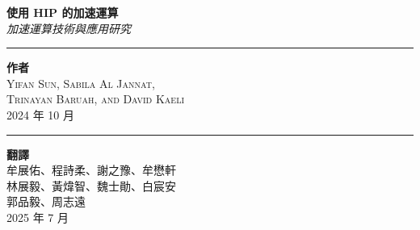 \begin{titlepage}


\vspace{2.5cm}
\parbox[l]{.9\textwidth}{\centering
    {\HUGE \bfseries 使用 HIP 的加速運算}\\[2\baselineskip]
    {\Large \textit{加速運算技術與應用研究}}\\[.5\baselineskip]}

\vspace*{\fill}

\parbox[b]{.5\textwidth}{
    \rule{1pt}{.125\textheight}
    \hspace{0.025\textwidth}
    \parbox[b]{.8\textwidth}{
        {\Large \bfseries 作者}\\[1\baselineskip]
        {\Large \textsc{Yifan Sun, Sabila Al Jannat, \\ Trinayan Baruah, and David Kaeli}}\\[2\baselineskip]
        {\Large 2024 年 10 月}
    }
}
\parbox[b]{.5\textwidth}{
    \rule{1pt}{.125\textheight}
    \hspace{0.025\textwidth}
    \parbox[b]{.8\textwidth}{
        {\Large \bfseries 翻譯}\\[1\baselineskip]
        {\Large \textsc{牟展佑、程詩柔、謝之豫、牟懋軒\\林展毅、黃煒智、魏士勛、白宸安\\郭品毅、周志遠}}\\[1\baselineskip]
        {\Large 2025 年 7 月}
    }
}
\end{titlepage}
